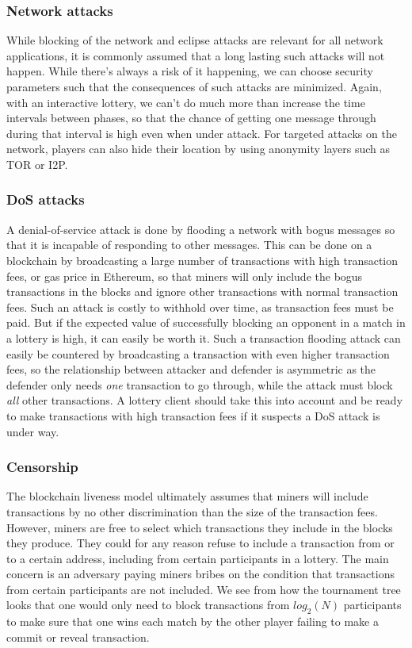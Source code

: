 \subsubsection{Network attacks} While blocking of the network and eclipse attacks are relevant for all network applications, it is commonly assumed that a long lasting such attacks will not happen. While there's always a risk of it happening, we can choose security parameters such that the consequences of such attacks are minimized. Again, with an interactive lottery, we can't do much more than increase the time intervals between phases, so that the chance of getting one message through during that interval is high even when under attack. For targeted attacks on the network, players can also hide their location by using anonymity layers such as TOR or I2P. 

\subsubsection{DoS attacks}
A denial-of-service attack is done by flooding a network with bogus messages so that it is incapable of responding to other messages. This can be done on a blockchain by broadcasting a large number of transactions with high transaction fees, or gas price in Ethereum, so that miners will only include the bogus transactions in the blocks and ignore other transactions with normal transaction fees. Such an attack is costly to withhold over time, as transaction fees must be paid. But if the expected value of successfully blocking an opponent in a match in a lottery is high, it can easily be worth it. Such a transaction flooding attack can easily be countered by broadcasting a transaction with even higher transaction fees, so the relationship between attacker and defender is asymmetric as the defender only needs \emph{one} transaction to go through, while the attack must block \emph{all} other transactions. A lottery client should take this into account and be ready to make transactions with high transaction fees if it suspects a DoS attack is under way.

\subsubsection{Censorship}
The blockchain liveness model ultimately assumes that miners will include transactions by no other discrimination than the size of the transaction fees. However, miners are free to select which transactions they include in the blocks they produce. They could for any reason refuse to include a transaction from or to a certain address, including from certain participants in a lottery. The main concern is an adversary paying miners bribes on the condition that transactions from certain participants are not included. We see from how the tournament tree looks that one would only need to block transactions from $log_2(N)$ participants to make sure that one wins each match by the other player failing to make a commit or reveal transaction. 

